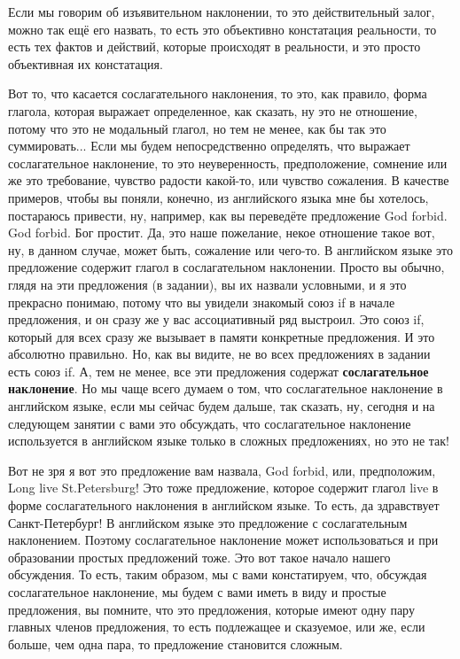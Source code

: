 \documentclass[main.tex]{subfiles}
\begin{document}
Если мы говорим об изъявительном наклонении, то это действительный залог, можно так ещё его назвать, то есть это объективно констатация реальности, то есть тех фактов и действий, которые происходят в реальности, и это просто объективная их констатация.

Вот то, что касается сослагательного наклонения, то это, как правило, форма глагола, которая выражает определенное, как сказать, ну это не отношение, потому что это не модальный глагол, но тем не менее, как бы так это суммировать...
Если мы будем непосредственно определять, что выражает сослагательное наклонение, то это неуверенность, предположение, сомнение или же это требование, чувство радости какой-то, или чувство сожаления.
В качестве примеров, чтобы вы поняли, конечно, из английского языка мне бы хотелось, постараюсь привести, ну, например, как вы переведёте предложение God forbid.
God forbid.
Бог простит.
Да, это наше пожелание, некое отношение такое вот, ну, в данном случае, может быть, сожаление или чего-то.
В английском языке это предложение содержит глагол в сослагательном наклонении.
Просто вы обычно, глядя на эти предложения (в задании), вы их назвали условными, и я это прекрасно понимаю, потому что вы увидели знакомый союз if в начале предложения, и он сразу же у вас ассоциативный ряд выстроил.
Это союз if, который для всех сразу же вызывает в памяти конкретные предложения.
И это абсолютно правильно.
Но, как вы видите, не во всех предложениях в задании есть союз if.
А, тем не менее, все эти предложения содержат \textbf{сослагательное наклонение}.
Но мы чаще всего думаем о том, что сослагательное наклонение в английском языке, если мы сейчас будем дальше, так сказать, ну, сегодня и на следующем занятии с вами это обсуждать, что сослагательное наклонение используется в английском языке только в сложных предложениях, но это не так!

Вот не зря я вот это предложение вам назвала, God forbid, или, предположим, Long live St.Petersburg!
Это тоже предложение, которое содержит глагол live в форме сослагательного наклонения в английском языке.
То есть, да здравствует Санкт-Петербург!
В английском языке это предложение с сослагательным наклонением.
Поэтому сослагательное наклонение может использоваться и при образовании простых предложений тоже.
Это вот такое начало нашего обсуждения.
То есть, таким образом, мы с вами констатируем, что, обсуждая сослагательное наклонение, мы будем с вами иметь в виду и простые предложения, вы помните, что это предложения, которые имеют одну пару главных членов предложения, то есть подлежащее и сказуемое, или же, если больше, чем одна пара, то предложение становится сложным.
\end{document}
